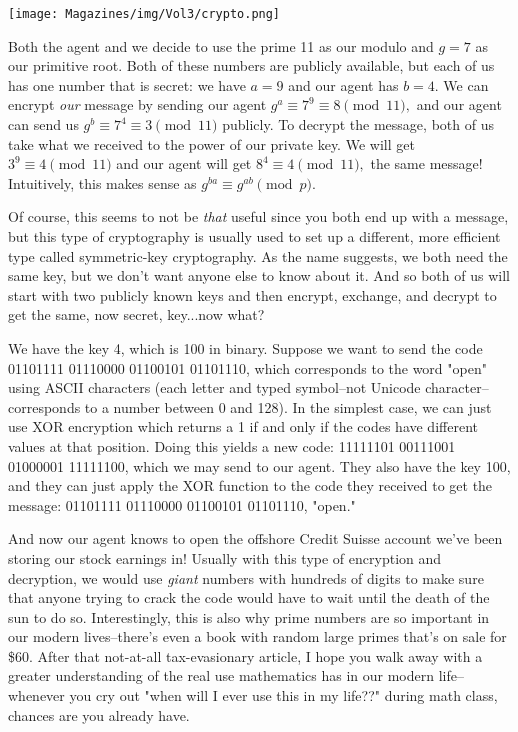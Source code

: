 \documentclass{article}
\begin{document}
\begin{multicols}{3}
\begin{center}
\texttt{[image: Magazines/img/Vol3/crypto.png]}
\end{center}

Both the agent and we decide to use the prime 11 as our modulo and $g=7$ as our primitive root. Both of these numbers are publicly available, but each of us has one number that is secret: we have $a=9$ and our agent has $b=4$. We can encrypt \textit{our} message by sending our agent $g^a \equiv 7^9 \equiv 8 \pmod{11},$ and our agent can send us $g^b \equiv 7^4 \equiv 3 \pmod{11}$ publicly. To decrypt the message, both of us take what we received to the power of our private key. We will get $3^9 \equiv 4 \pmod{11}$ and our agent will get $8^4 \equiv 4 \pmod{11},$ the same message! Intuitively, this makes sense as $g^{ba} \equiv g^{ab} \pmod{p}.$

Of course, this seems to not be \textit{that} useful since you both end up with a message, but this type of cryptography is usually used to set up a different, more efficient type called symmetric-key cryptography. As the name suggests, we both need the same key, but we don't want anyone else to know about it. And so both of us will start with two publicly known keys and then encrypt, exchange, and decrypt to get the same, now secret, key...now what?

We have the key 4, which is 100 in binary. Suppose we want to send the code 01101111 01110000 01100101 01101110, which corresponds to the word "open" using ASCII characters (each letter and typed symbol--not Unicode character--corresponds to a number between 0 and 128). In the simplest case, we can just use XOR encryption which returns a 1 if and only if the codes have different values at that position. Doing this yields a new code: 11111101 00111001 01000001 11111100, which we may send to our agent. They also have the key 100, and they can just apply the XOR function to the code they received to get the message: 01101111 01110000 01100101 01101110, "open."

And now our agent knows to open the offshore Credit Suisse account we've been storing our stock earnings in! Usually with this type of encryption and decryption, we would use \textit{giant} numbers with hundreds of digits to make sure that anyone trying to crack the code would have to wait until the death of the sun to do so. Interestingly, this is also why prime numbers are so important in our modern lives--there's even a book with random large primes that's on sale for \$60. After that not-at-all tax-evasionary article, I hope you walk away with a greater understanding of the real use mathematics has in our modern life--whenever you cry out "when will I ever use this in my life??" during math class, chances are you already have. 
\closearticle
{}


\end{multicols}
\end{document}
